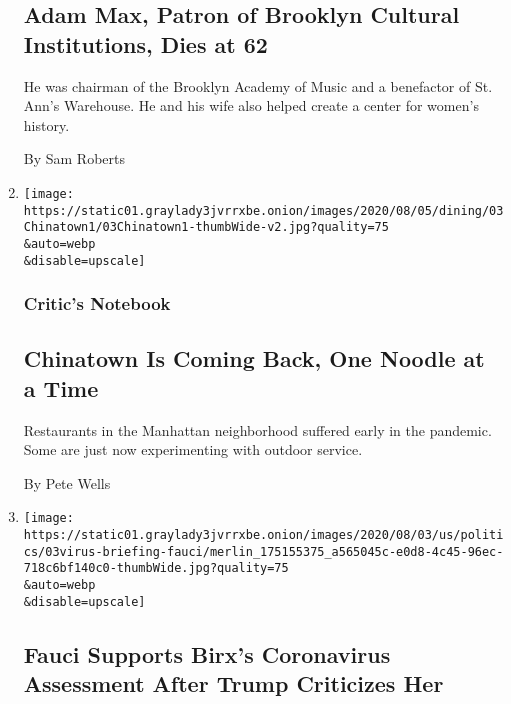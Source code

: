 \begin{enumerate}
  \hypertarget{adam-max-patron-of-brooklyn-cultural-institutions-dies-at-62}{%
  \subsection{Adam Max, Patron of Brooklyn Cultural Institutions, Dies
  at
  62}\label{adam-max-patron-of-brooklyn-cultural-institutions-dies-at-62}}

  He was chairman of the Brooklyn Academy of Music and a benefactor of
  St. Ann's Warehouse. He and his wife also helped create a center for
  women's history.

  By Sam Roberts
\item
  \href{/2020/08/03/dining/chinatown-outdoor-dining-coronavirus.html}{}

  \texttt{[image: https://static01.graylady3jvrrxbe.onion/images/2020/08/05/dining/03Chinatown1/03Chinatown1-thumbWide-v2.jpg?quality=75\\\&auto=webp\\\&disable=upscale]}

  \hypertarget{critics-notebook}{%
  \subsubsection{Critic's Notebook}\label{critics-notebook}}

  \hypertarget{chinatown-is-coming-back-one-noodle-at-a-time}{%
  \subsection{Chinatown Is Coming Back, One Noodle at a
  Time}\label{chinatown-is-coming-back-one-noodle-at-a-time}}

  Restaurants in the Manhattan neighborhood suffered early in the
  pandemic. Some are just now experimenting with outdoor service.

  By Pete Wells
\item
  \href{/2020/08/03/world/coronavirus-covid-19.html}{}

  \texttt{[image: https://static01.graylady3jvrrxbe.onion/images/2020/08/03/us/politics/03virus-briefing-fauci/merlin\_175155375\_a565045c-e0d8-4c45-96ec-718c6bf140c0-thumbWide.jpg?quality=75\\\&auto=webp\\\&disable=upscale]}

  \hypertarget{fauci-supports-birxs-coronavirus-assessment-after-trump-criticizes-her}{%
  \subsection{Fauci Supports Birx's Coronavirus Assessment After Trump
  Criticizes
  Her}\label{fauci-supports-birxs-coronavirus-assessment-after-trump-criticizes-her}}


\end{enumerate}
